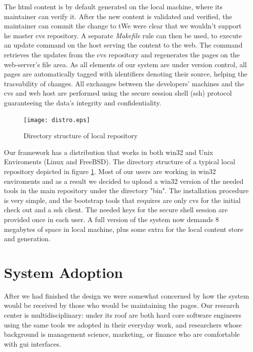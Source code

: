 \documentclass[10pt]{article}
\begin{document}
The {\sc html} content is by default generated on the
local machine, where its maintainer can verify it.
After the new content is validated and verified,
the maintainer can commit the change to tWe were clear 
that we wouldn't support he master {\sc cvs} repository.
A separate {\em Makefile} rule can then be used,
to execute an update command on the
host serving the content to the web.
The command retrieves the updates from the {\sc cvs}
repository and regenerates the pages on the web-server's
file area.
As all elements of our system are under version control,
all pages are automatically tagged with identifiers
denoting their source, helping the traceability of changes.
All exchanges between the developers' machines and the
{\sc cvs} and web host are performed using the secure session
shell ({\sc ssh}) protocol guaranteeing the data's integrity
and confidentiality.

\begin{figure}
\texttt{[image: distro.eps]}
\caption{Directory structure of local repository}
\label{fig:eltrun-web-distro}
\end{figure}

Our framework has a distribution that works in both win32 and 
Unix Enviroments (Linux and FreeBSD). The directory structure of a typical local repository depicted in
figure \ref{fig:eltrun-web-distro}.
Most of our users are working in win32 enviroments and as 
a result we decided to upload a win32 version of the needed tools 
in the main repository under the directory "bin". The installation procedure is very simple,
and the bootstrap tools that requires are only cvs for 
the initial check out and a ssh client. The needed keys 
for the secure shell session are provided once in each user. 
A full version of the system now demands 8 megabytes of space 
in local machine, plus some extra for the local content store and generation.

\section{System Adoption}
\label{sec:adopt}
After we had finished the design we were somewhat concerned
by how the system would be received by those who would be
maintaining the pages.
Our research center is multidisciplinary: under its roof
are both hard core software engineers using the same tools
we adopted in their everyday work, and researchers whose
background is management science, marketing, or finance
who are comfortable with {\sc gui} interfaces.
\end{document}
